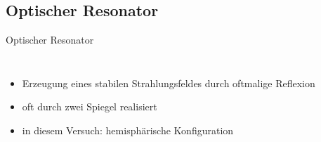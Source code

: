\documentclass[10pt, aspectratio=169]{beamer}
\begin{document}
\subsection{Optischer Resonator}
\label{sec:reso}

\begin{frame}{Optischer Resonator}
  \begin{columns}
      
    \begin{itemize}
    \item<1-> Erzeugung eines stabilen Strahlungsfeldes durch
      oftmalige Reflexion
    \item<2-> oft durch zwei Spiegel realisiert
    \item<2-> in diesem Versuch: hemisph\"arische Konfiguration
    \end{itemize}
  \end{columns}
\end{frame}
\end{document}
